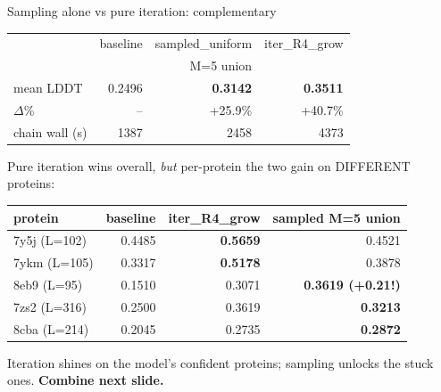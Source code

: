 \documentclass[aspectratio=169,11pt]{beamer}
\begin{document}
\begin{frame}{Sampling alone vs pure iteration: complementary}
  \footnotesize
  \begin{center}
    \begin{tabular}{lrrr}
      \toprule
       & baseline & sampled\_uniform & iter\_R4\_grow \\
       & & M=5 union & \\
      \midrule
      mean LDDT     & 0.2496 & \textbf{0.3142} & \textbf{0.3511} \\
      $\Delta$\%    & --     & +25.9\%         & +40.7\%         \\
      chain wall (s)& 1387   & 2458            & 4373            \\
      \bottomrule
    \end{tabular}
  \end{center}
  \vspace{0.3em}
  Pure iteration wins overall, \emph{but} per-protein the two gain on
  DIFFERENT proteins:
  \vspace{0.2em}
  \begin{center}
    \begin{tabular}{lrrr}
      \toprule
      protein & baseline & iter\_R4\_grow & sampled M=5 union \\
      \midrule
      7y5j (L=102)  & 0.4485 & \textbf{0.5659} & 0.4521 \\
      7ykm (L=105)  & 0.3317 & \textbf{0.5178} & 0.3878 \\
      8eb9 (L=95)   & 0.1510 & 0.3071          & \textbf{0.3619 (+0.21!)} \\
      7zs2 (L=316)  & 0.2500 & 0.3619          & \textbf{0.3213} \\
      8cba (L=214)  & 0.2045 & 0.2735          & \textbf{0.2872} \\
      \bottomrule
    \end{tabular}
  \end{center}
  \vspace{0.2em}
  Iteration shines on the model's confident proteins; sampling unlocks
  the stuck ones. \textbf{Combine \textrightarrow{} next slide.}
\end{frame}
\end{document}
